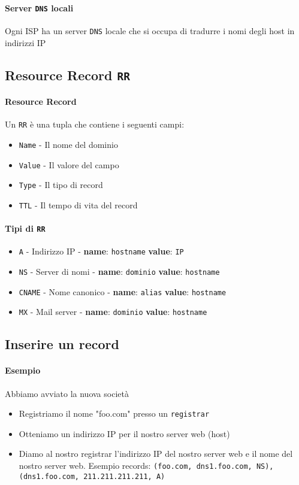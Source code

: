         \paragraph{Server \texttt{DNS} locali} Ogni ISP ha un server \texttt{DNS} locale che si occupa di tradurre i nomi degli host in indirizzi IP
    \subsection{Resource Record \texttt{RR}}
        \paragraph{Resource Record} Un \texttt{RR} è una tupla che contiene i seguenti campi:
        \begin{itemize}
            \item \texttt{Name} - Il nome del dominio
            \item \texttt{Value} - Il valore del campo
            \item \texttt{Type} - Il tipo di record
            \item \texttt{TTL} - Il tempo di vita del record
        \end{itemize}
        \paragraph{Tipi di \texttt{RR}}
        \begin{itemize}
            \item \texttt{A} - Indirizzo IP - \textbf{name}: \texttt{hostname} \textbf{value}: \texttt{IP}
            \item \texttt{NS} - Server di nomi - \textbf{name}: \texttt{dominio} \textbf{value}: \texttt{hostname}
            \item \texttt{CNAME} - Nome canonico - \textbf{name}: \texttt{alias} \textbf{value}: \texttt{hostname}
            \item \texttt{MX} - Mail server - \textbf{name}: \texttt{dominio} \textbf{value}: \texttt{hostname}
        \end{itemize}
    \subsection{Inserire un record}
        \paragraph{Esempio} Abbiamo avviato la nuova società
        \begin{itemize}
            \item Registriamo il nome "foo.com" presso un \texttt{registrar}
            \item Otteniamo un indirizzo IP per il nostro server web (host)
            \item Diamo al nostro registrar l'indirizzo IP del nostro server web e il nome del nostro server web. Esempio records: \texttt{(foo.com, dns1.foo.com, NS), (dns1.foo.com, 211.211.211.211, A)}
        \end{itemize}